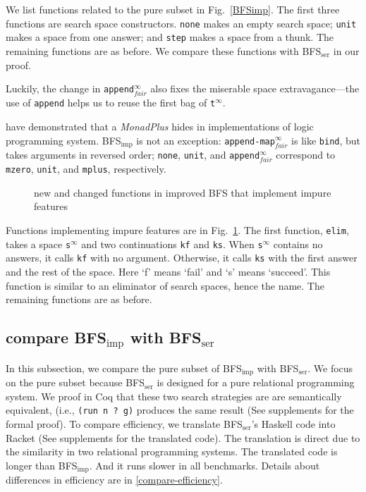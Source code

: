\documentclass[format=acmlarge, review=true, authordraft=true]{acmart}
\newcommand{\BFSser}[0]{BFS$_\textrm{ser}$}
\newcommand{\BFSimp}[0]{BFS$_\textrm{imp}$}
\begin{document}
We list functions related to the pure subset in Fig.~\ref{BFSimp}. The first 
three functions are search space constructors. \texttt{none} makes an empty 
search space; \texttt{unit} makes a space from one answer; and \texttt{step} 
makes a space from a thunk. The remaining functions are as before. We compare 
these functions with \BFSser{} in our proof. 

Luckily, the change in \texttt{append$^\infty_{fair}$} also fixes the miserable 
space extravagance---the use of \texttt{append} helps us to reuse the first bag 
of \texttt{t$^\infty$}.


\citet{kiselyov2005backtracking} have demonstrated that a \emph{MonadPlus} 
hides in implementations of logic programming system. \BFSimp{} is not an 
exception: \texttt{append-map$^\infty_{fair}$} is like \texttt{bind}, but takes 
arguments in reversed order; \texttt{none}, \texttt{unit}, and 
\texttt{append$^\infty_{fair}$} correspond to \texttt{mzero}, \texttt{unit}, and 
\texttt{mplus}, respectively.

\begin{figure}
		
	\caption{new and changed functions in improved BFS that implement impure 
		features}
	\label{BFSimp-cont}
\end{figure}

Functions implementing impure features are in Fig.~\ref{BFSimp-cont}. The 
first function, \texttt{elim}, takes a space \texttt{s$^\infty$} and two 
continuations \texttt{kf} and \texttt{ks}. When \texttt{s$^\infty$} contains 
no answers, it calls \texttt{kf} with no argument. Otherwise, it calls 
\texttt{ks} with the first answer and the rest of the space. Here  `f' means 
`fail' and `s' means `succeed'. This function is similar to an eliminator of 
search spaces, hence the name. The remaining functions are as before.


\subsection{compare \BFSimp{} with \BFSser{}}

In this subsection, we compare the pure subset of \BFSimp{} with \BFSser{}. We 
focus on the pure subset because \BFSser{} is designed for a pure 
relational programming system. We proof in Coq that these two search strategies 
are are semantically equivalent, (i.e., \texttt{(run n ? g)} produces the same 
result (See supplements for the formal proof). To compare efficiency, we 
translate \BFSser{}'s Haskell code into Racket (See supplements for the 
translated code). The translation is direct due to the similarity in two 
relational programming systems. The translated code is longer than \BFSimp{}. 
And it runs slower in all benchmarks. Details about differences in efficiency 
are in \autoref{compare-efficiency}.
\end{document}
